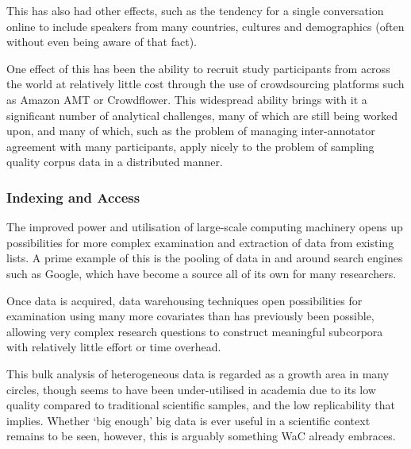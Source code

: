 This has also had other effects, such as the tendency for a single conversation online to include speakers from many countries, cultures and demographics (often without even being aware of that fact).  

One effect of this has been the ability to recruit study participants from across the world at relatively little cost through the use of crowdsourcing platforms such as Amazon AMT\cite{ipeirotis2010analyzing} or Crowdflower\cite{Finin:2010:ANE:1866696.1866709}.  This widespread ability brings with it a significant number of analytical challenges, many of which are still being worked upon, and many of which, such as the problem of managing inter-annotator agreement with many participants, apply nicely to the problem of sampling quality corpus data in a distributed manner.

  


\subsubsection{Indexing and Access}
The improved power and utilisation of large-scale computing machinery opens up possibilities for more complex examination and extraction of data from existing lists.  A prime example of this is the pooling of data in and around search engines such as Google, which have become a source all of its own for many researchers\cite{kilgarriff2007googleology}.

Once data is acquired, data warehousing techniques open possibilities for examination using many more covariates than has previously been possible, allowing very complex research questions to construct meaningful subcorpora with relatively little effort or time overhead.

This bulk analysis of heterogeneous data is regarded as a growth area in many circles, though seems to have been under-utilised in academia due to its low quality compared to traditional scientific samples, and the low replicability that implies.  Whether `big enough' big data is ever useful in a scientific context remains to be seen, however, this is arguably something WaC already embraces.




